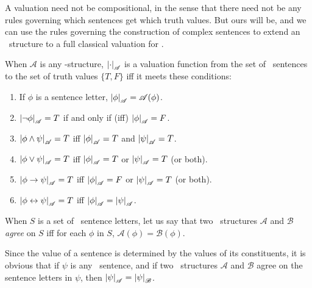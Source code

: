 	A valuation need not be compositional, in the sense that there need not be any rules governing which sentences get which truth values. But ours will be, and we can use the rules governing the construction of complex sentences to extend an \lone\ structure to a full classical valuation for \lone.
\begin{definition}\label{value}
		When $\mathscr{A}$ is any \lone-structure, $\left|\cdot\right|_{\mathscr{A}}$ is a valuation function from the set of \lone\ sentences to the set of truth values $\{T, F\}$ iff it meets these conditions: \begin{enumerate}
			\item If $\phi$ is a sentence letter, $\left|\phi\right|_{\mathscr{A}} = \mathscr{A}(\phi)$.
			\item $\left|\neg \phi\right|_{\mathscr{A}} = T$ if and only if (iff) $\left|\phi\right|_{\mathscr{A}}= F$.
			\item $\left|\phi \wedge \psi\right|_{\mathscr{A}} = T$ iff $\left|\phi\right|_{\mathscr{A}}=T$ and $\left|\psi\right|_{\mathscr{A}}=T$.
			\item $\left|\phi \vee \psi\right|_{\mathscr{A}} = T$ iff $\left|\phi\right|_{\mathscr{A}}=T$ or $\left|\psi\right|_{\mathscr{A}}=T$ (or both).
			\item $\left|\phi \to \psi\right|_{\mathscr{A}} = T$ iff $\left|\phi\right|_{\mathscr{A}}=F$ or $\left|\psi\right|_{\mathscr{A}}=T$ (or both).
			\item $\left|\phi \leftrightarrow \psi\right|_{\mathscr{A}} = T$ iff $\left|\phi\right|_{\mathscr{A}}=\left|\psi\right|_{\mathscr{A}}$.
		\end{enumerate}
	\end{definition}

\begin{definition}\label{agreestr}
	When $S$ is a set of \lone\ sentence letters, let us say that two \lone\ structures $\mathscr{A}$ and $\mathscr{B}$ \emph{agree} on $S$ iff for each $\phi$ in $S$, $\mathscr{A}(\phi) = \mathscr{B}(\phi)$. 
\end{definition}
Since the value of a sentence is determined by the values of its constituents, it is obvious that if $\psi$ is any \lone\ sentence, and if two \lone\ structures $\mathscr{A}$ and $\mathscr{B}$ agree on the sentence letters in $\psi$, then $\left|\psi\right|_{\mathscr{A}}=\left|\psi\right|_{\mathscr{B}}$.  

